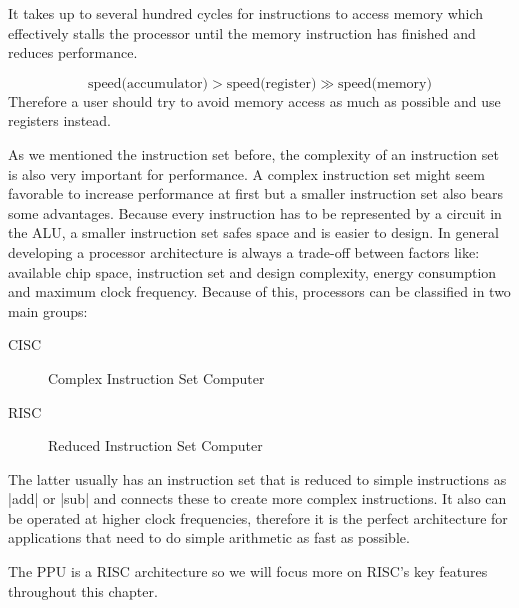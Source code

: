 It takes up to several hundred cycles for instructions to access memory which effectively stalls the processor until the memory instruction has finished and reduces performance.

\begin{equation*}
    \text{speed(accumulator)} > \text{speed(register)} \gg \text{speed(memory)}
\end{equation*}
Therefore a user should try to avoid memory access as much as possible and use registers instead.

As we mentioned the instruction set before, the complexity of an instruction set is also very important for performance. 
A complex instruction set might seem favorable to increase performance at first but a smaller instruction set also bears some advantages.
Because every instruction has to be represented by a circuit in the ALU, a smaller instruction set safes space and is easier to design.
In general developing a processor architecture is always a trade-off between factors like: available chip space, instruction set and design complexity, energy consumption and maximum clock frequency.
Because of this, processors can be classified in two main groups:
\begin{description}
    \item[CISC] Complex Instruction Set Computer
    \item[RISC] Reduced Instruction Set Computer
\end{description}
The latter usually has an instruction set that is reduced to simple instructions as |add| or |sub| and connects these to create more complex instructions.
It also can be operated at higher clock frequencies, therefore it is the perfect architecture for applications that need to do simple arithmetic as fast as possible.

The PPU is a RISC architecture so we will focus more on RISC's key features throughout this chapter.

